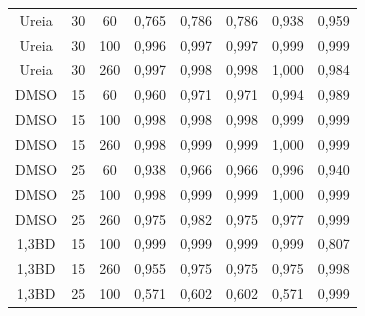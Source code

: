 \begin{table}[h]
{\begin{tabular}{c c c | c c c c c}
			Ureia   & 30        & 60         & 0,765   & 0,786    & 0,786    & 0,938   & 0,959  \\
			Ureia   & 30        & 100        & 0,996   & 0,997    & 0,997    & 0,999   & 0,999  \\
			Ureia   & 30        & 260        & 0,997   & 0,998    & 0,998    & 1,000   & 0,984  \\ \midrule
			DMSO    & 15        & 60         & 0,960   & 0,971    & 0,971    & 0,994   & 0,989  \\
			DMSO    & 15        & 100        & 0,998   & 0,998    & 0,998    & 0,999   & 0,999  \\
			DMSO    & 15        & 260        & 0,998   & 0,999    & 0,999    & 1,000   & 0,999  \\
			DMSO    & 25        & 60         & 0,938   & 0,966    & 0,966    & 0,996   & 0,940  \\
			DMSO    & 25        & 100        & 0,998   & 0,999    & 0,999    & 1,000   & 0,999  \\
			DMSO    & 25        & 260        & 0,975   & 0,982    & 0,975    & 0,977   & 0,999  \\
			1,3BD   & 15        & 100        & 0,999   & 0,999    & 0,999    & 0,999   & 0,807  \\
			1,3BD   & 15        & 260        & 0,955   & 0,975    & 0,975    & 0,975   & 0,998  \\
			1,3BD   & 25        & 100        & 0,571   & 0,602    & 0,602    & 0,571   & 0,999    \\ \bottomrule
		\end{tabular}
	}{}
\end{table} 

